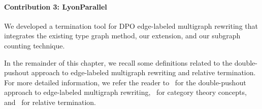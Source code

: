\paragraph{Contribution 3: LyonParallel}
We developed a termination tool for DPO edge-labeled multigraph rewriting that integrates the existing type graph method, our extension, and our subgraph counting technique.

In the remainder of this chapter, we recall some definitions related to the double-pushout approach to edge-labeled multigraph rewriting and relative termination. For more detailed information, we refer the reader to~\cite{konig2018atutorial,corradini1997algebraic} for the double-pushout approach to edge-labeled multigraph rewriting,~\cite{pierce1991basic,barr1990category} for category theory concepts, and~\cite{geser1990relative} for relative termination. 